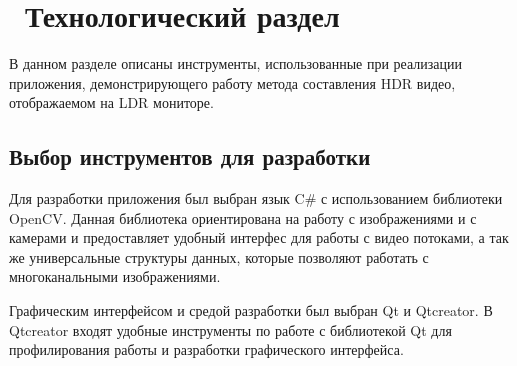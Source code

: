 \chapter{ Технологический раздел}
\label{cha:design}

В данном разделе описаны инструменты, использованные при реализации приложения, демонстрирующего работу метода составления HDR видео, отображаемом на LDR мониторе.

\section{ Выбор инструментов для разработки}

Для разработки приложения был выбран язык C# с использованием библиотеки OpenCV. Данная библиотека ориентирована на работу с изображениями и с камерами и предоставляет удобный интерфес для работы с видео потоками, а так же универсальные структуры данных, которые позволяют работать с многоканальными изображениями. 

Графическим интерфейсом и средой разработки был выбран Qt и Qtcreator. В Qtcreator входят удобные инструменты по работе с библиотекой Qt для профилирования работы и разработки графического интерфейса. 
